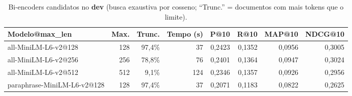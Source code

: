 \begin{table}[t]
\centering
\caption{Bi-encoders candidatos no \textbf{dev} (busca exaustiva por cosseno; ``Trunc.'' = documentos com mais tokens que o limite).}
\label{tab:dev_emb}
\small
\begin{tabular}{lrrrrrrr}
\toprule
Modelo@max\_len & Max. & Trunc. & Tempo (s) & P@10 & R@10 & MAP@10 & NDCG@10 \\
\midrule
all-MiniLM-L6-v2@128 & 128 & 97,4\% & 37 & 0,2423 & 0,1352 & 0,0956 & 0,3005 \\
all-MiniLM-L6-v2@256 & 256 & 78,8\% & 76 & 0,2401 & 0,1364 & 0,0947 & 0,3024 \\
all-MiniLM-L6-v2@512 & 512 & 9,1\% & 124 & 0,2346 & 0,1357 & 0,0926 & 0,2956 \\
paraphrase-MiniLM-L6-v2@128 & 128 & 97,4\% & 37 & 0,2071 & 0,1183 & 0,0822 & 0,2625 \\
\bottomrule
\end{tabular}
\end{table}
